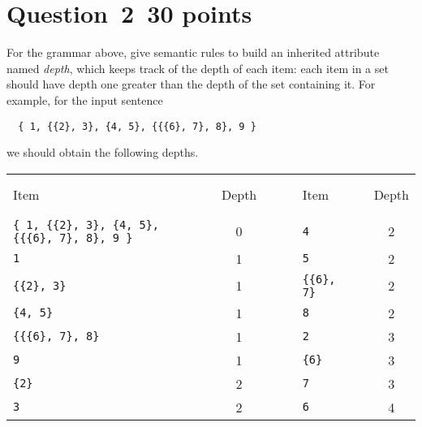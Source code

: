 \documentclass[10pt]{article}
\begin{document}
\section*{Question~2~\hfill 30 points}
For the grammar above, give semantic rules to build
an inherited attribute named \emph{depth},
which keeps track of the depth of each item:
each item in a set should have depth one greater
than the depth of the set containing it.
For example, for the input sentence
\begin{verbatim}
  { 1, {{2}, 3}, {4, 5}, {{{6}, 7}, 8}, 9 }
\end{verbatim}
we should obtain the following depths.
\begin{center}
\begin{tabular}{lrcrlrc}
  Item & & Depth & ~ ~ ~ & Item & & Depth \\
  \cline{1-1} \cline{3-3} \cline{5-5} \cline{7-7}
  \verb|{ 1, {{2}, 3}, {4, 5}, {{{6}, 7}, 8}, 9 }| && 0
  && \verb|4| && 2 \\
  \verb|1|  && 1
  && \verb|5| && 2 \\
  \verb|{{2}, 3}| && 1
  && \verb|{{6}, 7}| && 2 \\
  \verb|{4, 5}| && 1
  && \verb|8| && 2 \\
  \verb|{{{6}, 7}, 8}| && 1
  && \verb|2| && 3 \\
  \verb|9| && 1
  && \verb|{6}| && 3 \\
  \verb|{2}| && 2
  && \verb|7| && 3 \\
  \verb|3| && 2
  && \verb|6| && 4
\end{tabular}
\end{center}

\begin{framed}

\end{framed}
\end{document}
